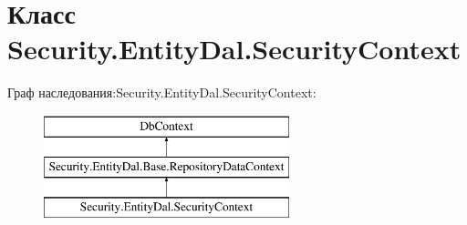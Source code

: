 \hypertarget{class_security_1_1_entity_dal_1_1_security_context}{}\section{Класс Security.\+Entity\+Dal.\+Security\+Context}
\label{class_security_1_1_entity_dal_1_1_security_context}
Граф наследования\+:Security.\+Entity\+Dal.\+Security\+Context\+:\begin{figure}[H]
\begin{center}
\leavevmode
\includegraphics[height=3.000000cm]{d0/da6/class_security_1_1_entity_dal_1_1_security_context}
\end{center}
\end{figure}
